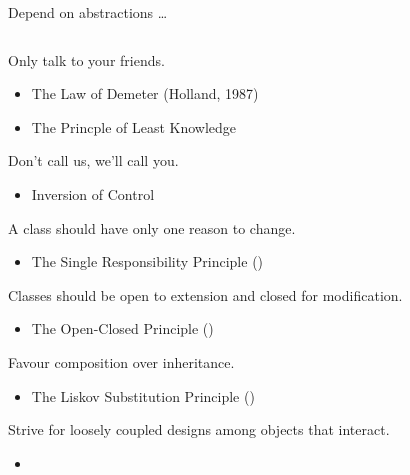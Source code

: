 \documentclass{beamer}
\begin{document}
\begin{frame}{Depend on abstractions \ldots}
    \vspace{0cm}
    \begin{columns}
        \column{\dimexpr\paperwidth-40pt}
        
    \end{columns}
\end{frame}

\begin{frame}{Only talk to your friends.}
    \begin{itemize}
        \item The Law of Demeter (Holland, 1987)
        \item The Princple of Least Knowledge
    \end{itemize}
\end{frame}

\begin{frame}{Don't call us, we'll call you.}
    \begin{itemize}
        \item Inversion of Control
    \end{itemize}
\end{frame}

\begin{frame}{A class should have only one reason to change.}
    \begin{itemize}
        \item The Single Responsibility Principle ()
    \end{itemize}
\end{frame}

\begin{frame}{Classes should be open to extension and closed for modification.}
    \begin{itemize}
        \item The Open-Closed Principle ()
    \end{itemize}
\end{frame}

\begin{frame}{Favour composition over inheritance.}
    \begin{itemize}
        \item The Liskov Substitution Principle ()
    \end{itemize}
\end{frame}

\begin{frame}{Strive for loosely coupled designs among objects that interact.}
    \begin{itemize}
        \item
    \end{itemize}
\end{frame}
\end{document}
